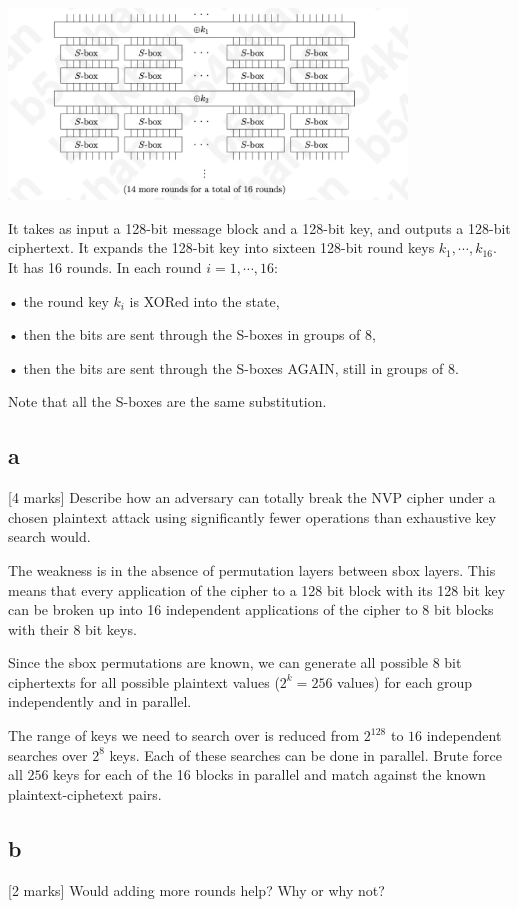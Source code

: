 \documentclass[11pt]{article}
\begin{document}
\includegraphics[width=400px]{a1q4.png}

It takes as input a 128-bit message block and a 128-bit key, and outputs a 128-bit ciphertext. It expands the 128-bit key into sixteen 128-bit round keys $k_1, \cdots, k_{16}$. It has 16 rounds. In each  round $i = 1, \cdots, 16$:

• the round key $k_i$ is XORed into the state,

• then the bits are sent through the S-boxes in groups of 8,

• then the bits are sent through the S-boxes AGAIN, still in groups of 8.

Note that all the S-boxes are the same substitution.

\subsection{a} [4 marks] Describe how an adversary can totally break the NVP cipher under a chosen plaintext attack using significantly fewer operations than exhaustive key search would.

The weakness is in the absence of permutation layers between sbox layers. This means that every application of the cipher to a 128 bit block with its 128 bit key can be broken up into 16 independent applications of the cipher to 8 bit blocks with their 8 bit keys.

Since the sbox permutations are known, we can generate all possible 8 bit ciphertexts for all possible plaintext values ($2^k = 256$ values) for each group independently and in parallel.

The range of keys we need to search over is reduced from $2^{128}$ to $16$ independent searches over $2^8$ keys. Each of these searches can be done in parallel. Brute force all $256$ keys for each of the 16 blocks in parallel and match against the known plaintext-ciphetext pairs. 

\subsection{b} [2 marks] Would adding more rounds help? Why or why not?
\end{document}
